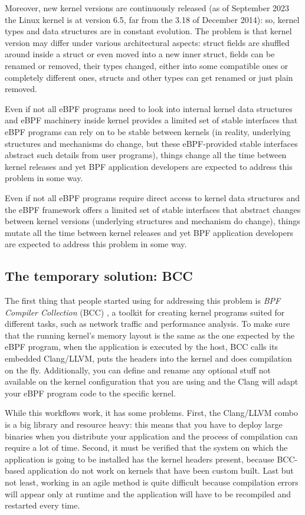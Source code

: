 Moreover, new kernel versions are continuously released (as of September 2023 the Linux kernel is at version 6.5, far from the 3.18 of December 2014): so, kernel types and data structures are in constant evolution.
The problem is that kernel version may differ under various architectural aspects: struct fields are shuffled around inside a struct or even moved into a new inner struct, fields can be renamed or removed, their types changed, either into some compatible ones or completely different ones, structs and other types can get renamed or just plain removed.

Even if not all eBPF programs need to look into internal kernel data structures and eBPF machinery inside kernel provides a limited set of stable interfaces that eBPF programs can rely on to be stable between kernels (in reality, underlying structures and mechanisms do change, but these eBPF-provided stable interfaces abstract such details from user programs), things change all the time between kernel releases and yet BPF application developers are expected to address this problem in some way. 

Even if not all eBPF programs require direct access to kernel data structures and the eBPF framework offers a limited set of stable interfaces that abstract changes between kernel versions (underlying structures and mechanism do change), things mutate all the time between kernel releases and yet BPF application developers are expected to address this problem in some way. 

\subsection{The temporary solution: BCC}

The first thing that people started using for addressing this problem is \textit{BPF Compiler Collection} (BCC) \cite{BCCGitHub}, a toolkit for creating kernel programs suited for different tasks, such as network traffic and performance analysis.
To make sure that the running kernel's memory layout is the same as the one expected by the eBPF program, when the application is executed by the host, BCC calls its embedded Clang/LLVM, puts the headers into the kernel and does compilation on the fly.
Additionally, you can define and rename any optional stuff not available on the kernel configuration that you are using and the Clang will adapt your eBPF program code to the specific kernel.

While this workflows work, it has some problems.
First, the Clang/LLVM combo is a big library and resource heavy: this means that you have to deploy large binaries when you distribute your application and the process of compilation can require a lot of time.
Second, it must be verified that the system on which the application is going to be installed has the kernel headers present, because BCC-based application do not work on kernels that have been custom built.
Last but not least, working in an agile method is quite difficult because compilation errors will appear only at runtime and the application will have to be recompiled and restarted every time.


